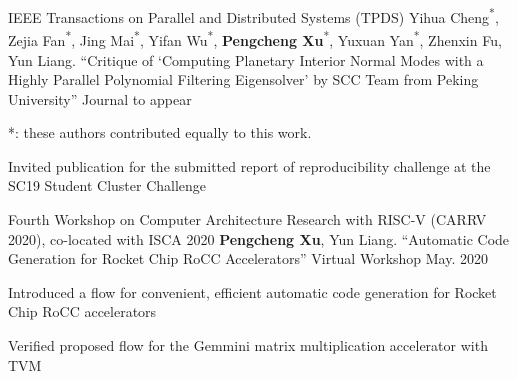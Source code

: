 

\begin{cventries}

  \cventry
    {IEEE Transactions on Parallel and Distributed Systems (TPDS)}
    {{\normalfont Yihua Cheng\textsuperscript{*}, Zejia Fan\textsuperscript{*}, Jing Mai\textsuperscript{*}, Yifan Wu\textsuperscript{*}, \textbf{Pengcheng Xu}\textsuperscript{*}, Yuxuan Yan\textsuperscript{*}, Zhenxin Fu, Yun Liang.}  ``Critique of `Computing Planetary Interior Normal Modes with a Highly Parallel Polynomial Filtering Eigensolver' by SCC Team from Peking University''}
    {Journal} %
    {to appear} %
    {
      \begin{cvitems} %
      \item {*: these authors contributed equally to this work.}
      \item {Invited publication for the submitted report of reproducibility challenge at the SC19 Student Cluster Challenge}
      \end{cvitems}
    }

  \cventry
    {Fourth Workshop on Computer Architecture Research with RISC-V (CARRV 2020), co-located with ISCA 2020} %
    {{\normalfont \textbf{Pengcheng Xu}, Yun Liang.} ``Automatic Code Generation for Rocket Chip RoCC Accelerators''} %
    {Virtual Workshop} %
    {May. 2020} %
    {
      \begin{cvitems} %
        \item {Introduced a flow for convenient, efficient automatic code generation for Rocket Chip RoCC accelerators}
        \item {Verified proposed flow for the Gemmini matrix multiplication accelerator with TVM}
      \end{cvitems}
    }
\end{cventries}

